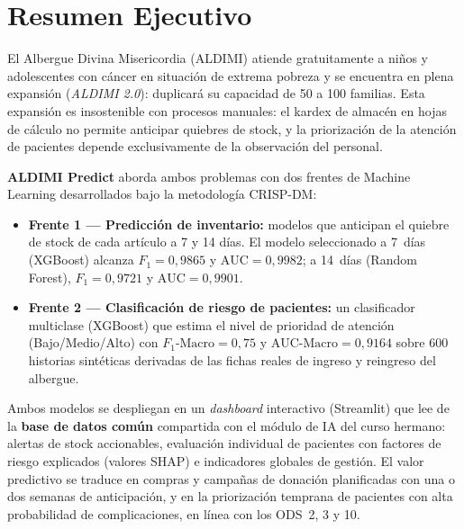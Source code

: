 \documentclass[12pt, a4paper]{article}
\begin{document}
\setcounter{page}{1}
\tableofcontents
\newpage

\section*{Resumen Ejecutivo}

El Albergue Divina Misericordia (ALDIMI) atiende gratuitamente a ni\~nos y adolescentes con c\'ancer en situaci\'on de extrema pobreza y se encuentra en plena expansi\'on (\emph{ALDIMI 2.0}): duplicar\'a su capacidad de 50 a 100 familias. Esta expansi\'on es insostenible con procesos manuales: el kardex de almac\'en en hojas de c\'alculo no permite anticipar quiebres de stock, y la priorizaci\'on de la atenci\'on de pacientes depende exclusivamente de la observaci\'on del personal.

\textbf{ALDIMI Predict} aborda ambos problemas con dos frentes de Machine Learning desarrollados bajo la metodolog\'ia CRISP-DM:

\begin{itemize}[leftmargin=1.6em, itemsep=4pt]
  \item \textbf{Frente 1 --- Predicci\'on de inventario:} modelos que anticipan el quiebre de stock de cada art\'iculo a 7 y 14 d\'ias. El modelo seleccionado a 7~d\'ias (XGBoost) alcanza $F_1 = 0{,}9865$ y $\text{AUC} = 0{,}9982$; a 14~d\'ias (Random Forest), $F_1 = 0{,}9721$ y $\text{AUC} = 0{,}9901$.
  \item \textbf{Frente 2 --- Clasificaci\'on de riesgo de pacientes:} un clasificador multiclase (XGBoost) que estima el nivel de prioridad de atenci\'on (Bajo/Medio/Alto) con $F_1\text{-Macro} = 0{,}75$ y $\text{AUC-Macro} = 0{,}9164$ sobre 600 historias sint\'eticas derivadas de las fichas reales de ingreso y reingreso del albergue.
\end{itemize}

Ambos modelos se despliegan en un \emph{dashboard} interactivo (Streamlit) que lee de la \textbf{base de datos com\'un} compartida con el m\'odulo de IA del curso hermano: alertas de stock accionables, evaluaci\'on individual de pacientes con factores de riesgo explicados (valores SHAP) e indicadores globales de gesti\'on. El valor predictivo se traduce en compras y campa\~nas de donaci\'on planificadas con una o dos semanas de anticipaci\'on, y en la priorizaci\'on temprana de pacientes con alta probabilidad de complicaciones, en l\'inea con los ODS~2, 3 y 10.
\newpage
\end{document}
